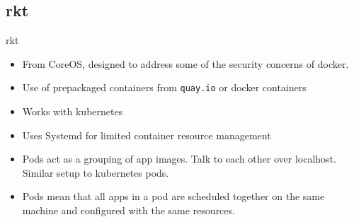 \subsection{rkt}
\begin{frame}[fragile]{rkt}

\begin{itemize}
\item From CoreOS, designed to address some of the security concerns of docker.
\item Use of prepackaged containers from \texttt{quay.io} or docker containers
\item Works with kubernetes 
\item \color{red}Uses Systemd for limited container resource management
\item \color{cobalt}Pods act as a grouping of app images. Talk to each other over localhost. Similar setup to kubernetes pods.
\item \color{cobalt}Pods mean that all apps in a pod are scheduled together on the same machine and configured with the same resources. 
\end{itemize}


\end{frame}